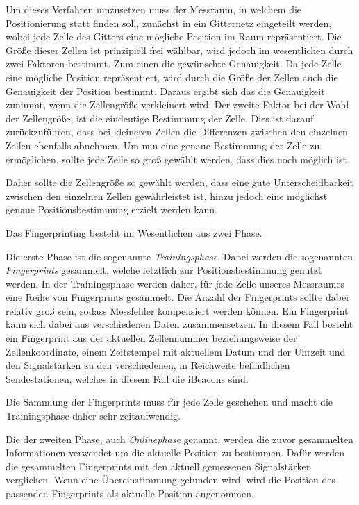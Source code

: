 Um dieses Verfahren umzusetzen muss der Messraum, in welchem die Positionierung statt finden soll, zunächst in ein Gitternetz eingeteilt werden, wobei jede Zelle des Gitters eine mögliche Position im Raum repräsentiert. Die Größe dieser Zellen ist prinzipiell frei wählbar, wird jedoch im wesentlichen durch zwei Faktoren bestimmt. 
Zum einen die gewünschte Genauigkeit. Da jede Zelle eine mögliche Position repräsentiert, wird durch die Größe der Zellen auch die Genauigkeit der Position bestimmt. Daraus ergibt sich das die Genauigkeit zunimmt, wenn die Zellengröße verkleinert wird.
Der zweite Faktor bei der Wahl der Zellengröße, ist die eindeutige Bestimmung der Zelle. Dies ist darauf zurückzuführen, dass bei kleineren Zellen die Differenzen zwischen den einzelnen Zellen ebenfalls abnehmen. Um nun eine genaue Bestimmung der Zelle zu ermöglichen, sollte jede Zelle so groß gewählt werden, dass dies noch möglich ist.

Daher sollte die Zellengröße so gewählt werden, dass eine gute Unterscheidbarkeit zwischen den einzelnen Zellen gewährleistet ist, hinzu jedoch eine möglichst genaue Positionsbestimmung erzielt werden kann.


Das Fingerprinting besteht im Wesentlichen aus zwei Phase.

Die erste Phase ist die sogenannte \emph{Trainingsphase}. Dabei werden die sogenannten \emph{Fingerprints} gesammelt, welche letztlich zur Positionsbestimmung genutzt werden. 
In der Trainingsphase werden daher, für jede Zelle unseres Messraumes eine Reihe von Fingerprints gesammelt. Die Anzahl der Fingerprints sollte dabei relativ groß sein, sodass Messfehler kompensiert werden können. 
Ein Fingerprint kann sich dabei aus verschiedenen Daten zusammensetzen. 
In diesem Fall besteht ein Fingerprint aus der aktuellen Zellennummer beziehungsweise der Zellenkoordinate, einem Zeitstempel mit aktuellem Datum und der Uhrzeit und den Signalstärken zu den verschiedenen, in Reichweite befindlichen Sendestationen, welches in diesem Fall die iBeacons sind.

Die Sammlung der Fingerprints muss für jede Zelle geschehen und macht die Trainingsphase daher sehr zeitaufwendig. 

Die der zweiten Phase, auch \emph{Onlinephase} genannt, werden die zuvor gesammelten Informationen verwendet um die aktuelle Position zu bestimmen. 
Dafür werden die gesammelten Fingerprints mit den aktuell gemessenen Signalstärken verglichen. Wenn eine Übereinstimmung gefunden wird, wird die Position des passenden Fingerprints als aktuelle Position angenommen.

